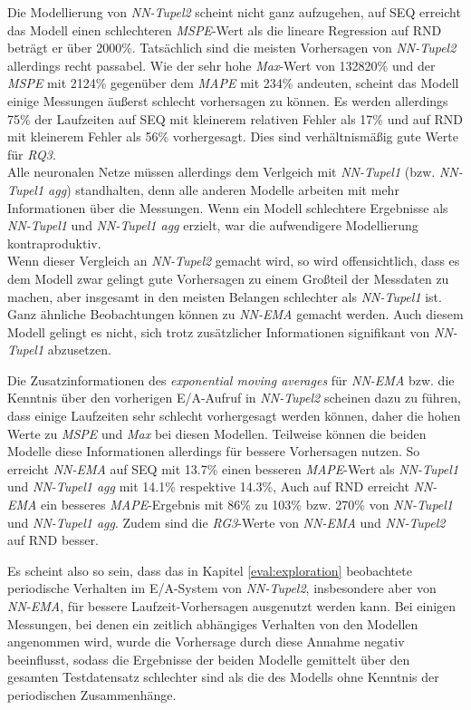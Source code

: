 \documentclass[
	12pt,
	a4paper,
	BCOR10mm,
	DIV14,
	listof=totoc,
	bibliography=totoc,
	headsepline
]{scrreprt}
\begin{document}
Die Modellierung von \textit{NN-Tupel2} scheint nicht ganz aufzugehen, auf SEQ erreicht das Modell einen schlechteren \textit{MSPE}-Wert als die lineare Regression auf RND beträgt er über 2000\%.
Tatsächlich sind die meisten Vorhersagen von \textit{NN-Tupel2} allerdings recht passabel.
Wie der sehr hohe \textit{Max}-Wert von 132820\% und der \textit{MSPE} mit 2124\% gegenüber dem \textit{MAPE} mit 234\% andeuten, scheint das Modell einige Messungen äußerst schlecht vorhersagen zu können.
Es werden allerdings 75\% der Laufzeiten auf SEQ mit kleinerem relativen Fehler als 17\% und auf RND mit kleinerem Fehler als 56\% vorhergesagt. Dies sind verhältnismäßig gute Werte für \textit{RQ3}.\\
Alle neuronalen Netze müssen allerdings dem Verlgeich mit \textit{NN-Tupel1} (bzw. \textit{NN-Tupel1 agg}) standhalten, denn alle anderen Modelle arbeiten mit mehr Informationen über die Messungen.
Wenn ein Modell schlechtere Ergebnisse als \textit{NN-Tupel1} und \textit{NN-Tupel1 agg} erzielt, war die aufwendigere Modellierung kontraproduktiv.\\
Wenn dieser Vergleich an \textit{NN-Tupel2} gemacht wird, so wird offensichtlich, dass es dem Modell zwar gelingt gute Vorhersagen zu einem Großteil der Messdaten zu machen, aber insgesamt in den meisten Belangen schlechter als \textit{NN-Tupel1} ist.\\
Ganz ähnliche Beobachtungen können zu \textit{NN-EMA} gemacht werden.
Auch diesem Modell gelingt es nicht, sich trotz zusätzlicher Informationen signifikant von \textit{NN-Tupel1} abzusetzen.\medskip

Die Zusatzinformationen des \textit{exponential moving averages} für \textit{NN-EMA} bzw. die Kenntnis über den vorherigen E/A-Aufruf in \textit{NN-Tupel2} scheinen dazu zu führen, dass einige Laufzeiten sehr schlecht vorhergesagt werden können, daher die hohen Werte zu \textit{MSPE} und \textit{Max} bei diesen Modellen.
Teilweise können die beiden Modelle diese Informationen allerdings für bessere Vorhersagen nutzen. So erreicht \textit{NN-EMA} auf SEQ mit 13.7\% einen besseren \textit{MAPE}-Wert als \textit{NN-Tupel1} und \textit{NN-Tupel1 agg} mit 14.1\% respektive 14.3\%, 
Auch auf RND erreicht \textit{NN-EMA} ein besseres \textit{MAPE}-Ergebnis mit 86\% zu 103\% bzw. 270\% von \textit{NN-Tupel1} und \textit{NN-Tupel1 agg}.
Zudem sind die \textit{RG3}-Werte von \textit{NN-EMA} und \textit{NN-Tupel2} auf RND besser.\medskip

Es scheint also so sein, dass das in Kapitel \ref{eval:exploration} beobachtete periodische Verhalten im E/A-System von \textit{NN-Tupel2}, insbesondere aber von \textit{NN-EMA}, für bessere Laufzeit-Vorhersagen ausgenutzt werden kann.
Bei einigen Messungen, bei denen ein zeitlich abhängiges Verhalten von den Modellen angenommen wird, wurde die Vorhersage durch diese Annahme negativ beeinflusst, sodass die Ergebnisse der beiden Modelle gemittelt über den gesamten Testdatensatz schlechter sind als die des Modells ohne Kenntnis der periodischen Zusammenhänge.
\end{document}
